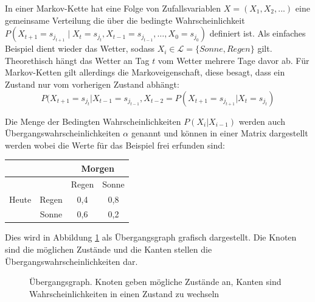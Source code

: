 \documentclass[12pt]{article}
\begin{document}
In einer Markov-Kette hat eine Folge von Zufallsvariablen $X=(X_1,X_2,...)$ eine gemeinsame Verteilung die über die bedingte Wahrscheinlichkeit $P(X_{t+1}=s_{j_{t+1}}\mid X_t=s_{j_t}, X_{t-1}=s_{j_{t-1}},\dots,X_0=s_{j_0})$ definiert ist. Als einfaches Beispiel dient wieder das Wetter, sodass $X_i \in \mathcal{L} = \{Sonne, Regen\}$ gilt. Theorethisch hängt das Wetter an Tag $t$ vom Wetter mehrere Tage davor ab. Für Markov-Ketten gilt allerdings die Markoveigenschaft, diese besagt, dass ein Zustand nur vom vorherigen Zustand abhängt:
\begin{equation}
P(X_{t+1}=s_{j_t}|X_{t-1}=s_{j_{t-1}},X_{t-2}=P(X_{t+1}=s_{j_{t+1}} | X_t=s_{j_{t}})
\end{equation}

Die Menge der Bedingten Wahrscheinlichkeiten $P(X_i|X_{i-1})$ werden auch Übergangswahrscheinlichkeiten $\alpha$ genannt und können in einer Matrix dargestellt werden wobei die Werte für das Beispiel frei erfunden sind:
\begin{table}[H]
\begin{center}
\begin{tabular}{c|c|c|c}
	&&\multicolumn{2}{c}{Morgen}\\\hline
	&&Regen&Sonne\\\cline{2-4}
	Heute&Regen& 0,4 & 0,8\\\cline{2-4}
	&Sonne&0,6&0,2\\
\end{tabular}
\end{center}
\end{table}

Dies wird in Abbildung \ref{Markovc} als Übergangsgraph grafisch dargestellt. Die Knoten sind die möglichen Zustände und die Kanten stellen die Übergangswahrscheinlichkeiten dar.

\begin{figure}[H]
\begin{center}
	\end{center}
	\caption{Übergangsgraph. Knoten geben mögliche Zustände an, Kanten sind Wahrscheinlichkeiten in einen Zustand zu wechseln}
	\label{Markovc}
\end{figure}
\end{document}
